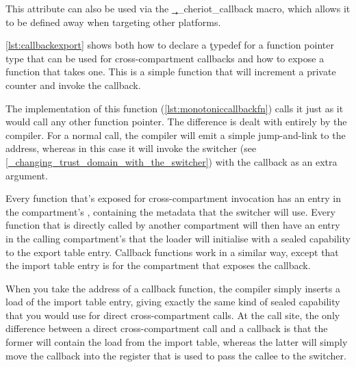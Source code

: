 {{This attribute can also be used via the \c{__cheriot_callback} macro, which allows it to be defined away when targeting other platforms.

\ref{lst:callbackexport} shows both how to declare a \c{typedef} for a function pointer type that can be used for cross-compartment callbacks and how to expose a function that takes one.
This is a simple function that will increment a private counter and invoke the callback.

\codelisting[filename=examples/compartment_annotation/interface.h,marker=compartment_export_callback,label=lst:callbackexport,caption="Exposing a function that takes a cross-compartment callback for use by other compartments."]{}

The implementation of this function (\ref{lst:monotoniccallbackfn}) calls it just as it would call any other function pointer.
The difference is dealt with entirely by the compiler.
For a normal call, the compiler will emit a simple jump-and-link to the address, whereas in this case it will invoke the switcher (see \ref{_changing_trust_domain_with_the_switcher}) with the callback as an extra argument.

Every function that's exposed for cross-compartment invocation has an entry in the compartment's , containing the metadata that the switcher will use.
Every function that is directly called by another compartment will then have an entry in the calling compartment's  that the loader will initialise with a sealed capability to the export table entry.
Callback functions work in a similar way, except that the import table entry is for the compartment that exposes the callback.

When you take the address of a callback function, the compiler simply inserts a load of the import table entry, giving exactly the same kind of sealed capability that you would use for direct cross-compartment calls.
At the call site, the only difference between a direct cross-compartment call and a callback is that the former will contain the load from the import table, whereas the latter will simply move the callback into the register that is used to pass the callee to the switcher.

\codelisting[filename=examples/compartment_annotation/compartment.cc,marker=monotonic,label=lst:monotoniccallbackfn,caption="The body of a function that invokes a cross-compartment callback."]{}

}}
